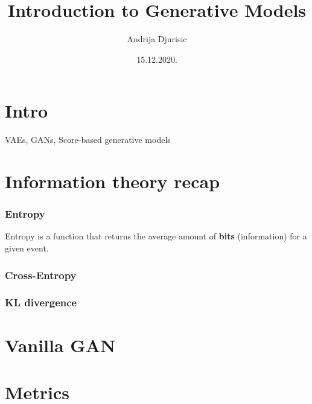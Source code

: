 \documentclass{article}
\title{Introduction to Generative Models}
\author{Andrija Djurisic}
\date{15.12.2020.}
\begin{document}
   \maketitle

\section{Intro}
VAEs, GANs, Score-based generative models

\section{Information theory recap}

\subsubsection{Entropy}
Entropy is a function that returns the average amount of \textbf{bits} (information) for a given event.
\subsubsection{Cross-Entropy}
\subsubsection{KL divergence}

\section{Vanilla GAN}
\section{Metrics}
\end{document}

